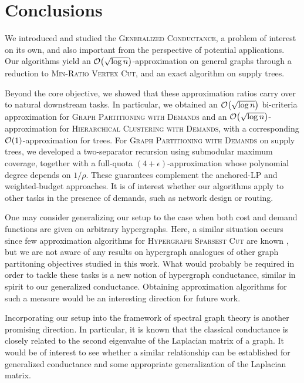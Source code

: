 \section{Conclusions}

We introduced and studied the \textsc{Generalized Conductance}, a problem of interest on its own, and also important from the perspective of potential applications. Our algorithms yield an $\mathcal{O}\mathopen{}\left( \sqrt{\log n} \right)$-approximation on general graphs through a reduction to \textsc{Min-Ratio Vertex Cut}, and an exact algorithm on supply trees.

Beyond the core objective, we showed that these approximation ratios carry over to natural downstream tasks. In particular, we obtained an $\mathcal{O}\mathopen{}\left( \sqrt{\log n} \right)$ bi-criteria approximation for \textsc{Graph Partitioning with Demands} and an $\mathcal{O}\mathopen{}\left( \sqrt{\log n} \right)$-approximation for \textsc{Hierarchical Clustering with Demands}, with a corresponding $\mathcal{O}\mathopen{}\left( 1 \right)$-approximation for trees. For \textsc{Graph Partitioning with Demands} on supply trees, we developed a two-separator recursion using submodular maximum coverage, together with a full-quota $(4+\epsilon)$-approximation whose polynomial degree depends on $1/\rho$. These guarantees complement the anchored-LP and weighted-budget approaches. It is of interest whether our algorithms apply to other tasks in the presence of demands, such as network design or routing.

One may consider generalizing our setup to the case when both cost and demand functions are given on arbitrary hypergraphs. Here, a similar situation occurs since few approximation algorithms for \textsc{Hypergraph Sparsest Cut} are known \cite{DiversityEmbeddingsAndTheHypergraphSparsestCut,BoundsOnTheMaxFlowMinCutRatioForDirectedMulticommodityFlows}, but we are not aware of any results on hypergraph analogues of other graph partitoning objectives studied in this work. What would probably be required in order to tackle these tasks is a new notion of hypergraph conductance, similar in spirit to our generalized conductance. Obtaining approximation algorithms for such a measure would be an interesting direction for future work.

Incorporating our setup into the framework of spectral graph theory is another promising direction. In particular, it is known that the classical conductance is closely related to the second eigenvalue of the Laplacian matrix of a graph. It would be of interest to see whether a similar relationship can be established for generalized conductance and some appropriate generalization of the Laplacian matrix.

